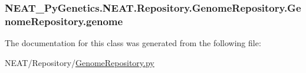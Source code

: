 \subsubsection[{\texorpdfstring{genome}{genome}}]{\setlength{\rightskip}{0pt plus 5cm}N\+E\+A\+T\+\_\+\+Py\+Genetics.\+N\+E\+A\+T.\+Repository.\+Genome\+Repository.\+Genome\+Repository.\+genome\hspace{0.3cm}{\ttfamily [static]}}\hypertarget{classNEAT__PyGenetics_1_1NEAT_1_1Repository_1_1GenomeRepository_1_1GenomeRepository_a23662b9337cfca1f402b206989747f45}{}\label{classNEAT__PyGenetics_1_1NEAT_1_1Repository_1_1GenomeRepository_1_1GenomeRepository_a23662b9337cfca1f402b206989747f45}


The documentation for this class was generated from the following file\+:\begin{DoxyCompactItemize}
\item 
N\+E\+A\+T/\+Repository/\hyperlink{GenomeRepository_8py}{Genome\+Repository.\+py}\end{DoxyCompactItemize}
